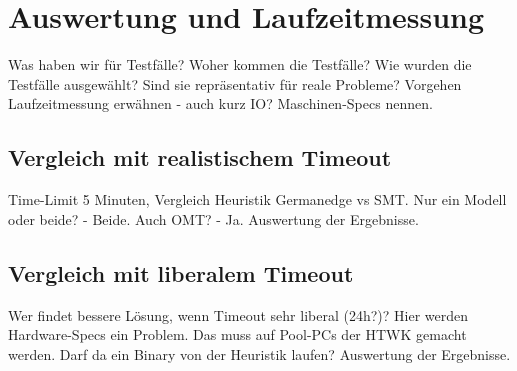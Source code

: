 \chapter{Auswertung und Laufzeitmessung}

Was haben wir für Testfälle?
Woher kommen die Testfälle?
Wie wurden die Testfälle ausgewählt?
Sind sie repräsentativ für reale Probleme?
Vorgehen Laufzeitmessung erwähnen - auch kurz IO?
Maschinen-Specs nennen.

\section{Vergleich mit realistischem Timeout}
Time-Limit 5 Minuten, Vergleich Heuristik Germanedge vs SMT.
Nur ein Modell oder beide? - Beide.
Auch OMT? - Ja.
Auswertung der Ergebnisse.

\section{Vergleich mit liberalem Timeout}
Wer findet bessere Lösung, wenn Timeout sehr liberal (24h?)?
Hier werden Hardware-Specs ein Problem.
Das muss auf Pool-PCs der HTWK gemacht werden.
Darf da ein Binary von der Heuristik laufen?
Auswertung der Ergebnisse.

